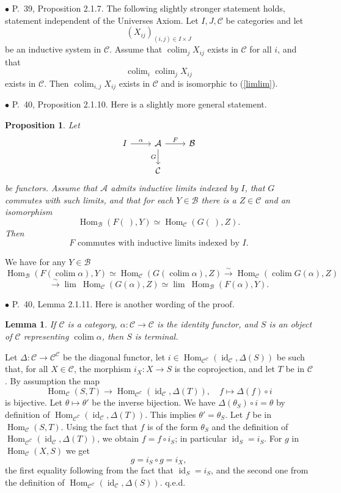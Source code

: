 \documentclass[12pt]{article}
\newtheorem{lem}[thm]{Lemma}
\newtheorem{prop}[thm]{Proposition}
\theoremstyle{remark}%
\newcommand{\bu}{\bullet}
\newcommand{\n}{\noindent}
\newcommand{\A}{\mathcal A}
\newcommand{\B}{\mathcal B}
\newcommand{\C}{\mathcal C}
\newcommand{\pf}{\n{\em Proof. }}
\newcommand{\bl}{\begin{lem}}
\newcommand{\el}{\end{lem}}
\newcommand{\bp}{\begin{prop}}
\newcommand{\ep}{\end{prop}}
\DeclareMathOperator*{\coli}{colim}
\DeclareMathOperator{\id}{id}
\DeclareMathOperator{\Hom}{Hom}
\DeclareMathOperator{\h}{Hom}
\begin{document}

\n$\bu$ P.~39, Proposition 2.1.7. The following slightly stronger statement holds, statement independent of the Universes Axiom. Let $I, J, \C$ be categories and let 
$$
(X_{ij})_{(i,j)\in I\times J}
$$ 
be an inductive system in $\C$. Assume that $\coli_jX_{ij}$ exists in $\C$ for all $i$, and that 
\begin{equation}\label{limlim}
\coli_i\coli_jX_{ij}
\end{equation}
exists in $\C$. Then $\coli_{i,j}X_{ij}$ exists in $\C$ and is isomorphic to (\ref{limlim}).


\n$\bu$ P.~40, Proposition 2.1.10. Here is a slightly more general statement. 
%
\bp 
Let 
$$
\begin{tikzcd}
I\ar{r}{\alpha}&\A\ar{d}[swap]{G}\ar{r}{F}&\B\\
&\C
\end{tikzcd}
$$
be functors. Assume that $\A$ admits inductive limits indexed by $I$, that $G$ commutes with such limits, and that for each $Y\in\B$ there is a $Z\in\C$ and an isomorphism 
$$
\Hom_\B(F(\ ),Y)\simeq\Hom_\C(G(\ ),Z). 
$$
Then 
\begin{equation}\label{2.1.10}
F\text{ commutes with inductive limits indexed by }I.
\end{equation}
\ep
%
\pf We have for any $Y\in\B$ 
$$ 
\Hom_\B\left(F\left(\coli\alpha\right),Y\right)\simeq
\Hom_\C\left(G\left(\coli\alpha\right),Z\right)
\overset{\sim}{\to}
\Hom_\C\left(\coli G(\alpha),Z\right)
$$
$$
\overset{\sim}{\to}\lim \ \Hom_\C(G(\alpha),Z)\simeq\lim \ \Hom_\B(F(\alpha),Y).
$$  


\n$\bu$ P.~40, Lemma 2.1.11. Here is another wording of the proof. 
%
\bl 
If $\C$ is a category, $\alpha:\C\to\C$ is the identity functor, and $S$ is an object of $\C$ representing $\coli\alpha$, then $S$ is terminal. 
\el
%
\pf Let $\Delta:\C\to\C^\C$ be the diagonal functor, let $i\in\h_{\C^\C}(\id_\C,\Delta(S))$ be such that, for all $X\in\C$, the morphism $i_X:X\to S$ is the coprojection, and let $T$ be in $\C$. By assumption the map 
$$
\h_\C(S,T)\to\h_{\C^\C}(\id_\C,\Delta(T)),\quad f\mapsto\Delta(f)\circ i 
$$ 
is bijective. Let $\theta\mapsto\theta'$ be the inverse bijection. We have $\Delta(\theta_S)\circ i=\theta$ by definition of $\h_{\C^\C}(\id_\C,\Delta(T))$. This implies $\theta'=\theta_S$. Let $f$ be in $\h_\C(S,T)$. Using the fact that $f$ is of the form $\theta_S$ and the definition of $\h_{\C^\C}(\id_\C,\Delta(T))$, we obtain $f=f\circ i_S$; in particular $\id_S=i_S$. For $g$ in $\h_\C(X,S)$ we get 
$$
g=i_S\circ g=i_X,
$$
the first equality following from the fact that $\id_S=i_S$, and the second one from the definition of $\h_{\C^\C}(\id_\C,\Delta(S))$. q.e.d. 
\end{document}
